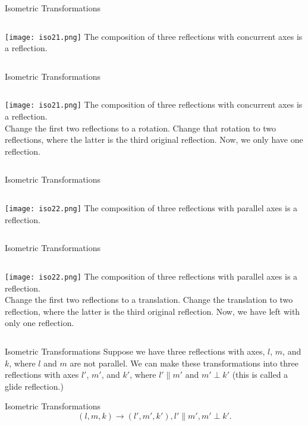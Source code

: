 \documentclass{beamer}
\begin{document}
\begin{frame}{Isometric Transformations}
	\begin{columns}
		\texttt{[image: iso21.png]}
		The composition of three reflections with concurrent
		axes is a reflection.
	\end{columns}
\end{frame}
\begin{frame}{Isometric Transformations}
	\begin{columns}
		\column{0.6\textwidth}
		\texttt{[image: iso21.png]}
		\column{0.4\textwidth}
		The composition of three reflections with concurrent
		axes is a reflection.\\
		\phantom{Spacing}
		Change the first two reflections to a rotation.
		Change that rotation to two reflections, where the
		latter is the third original reflection. Now, we 
		only have one reflection.
	\end{columns}
\end{frame}
\begin{frame}{Isometric Transformations}
	\begin{columns}
		\texttt{[image: iso22.png]}
		The composition of three reflections with parallel axes
		is a reflection.
	\end{columns}
\end{frame}
\begin{frame}{Isometric Transformations}
	\begin{columns}
		\column{0.6\textwidth}
		\texttt{[image: iso22.png]}
		\column{0.4\textwidth}
		The composition of three reflections with parallel axes
		is a reflection.\\
		\phantom{Spacing}
		Change the first two reflections to a translation.
		Change the translation to two reflection, where
		the latter is the third original reflection. Now,
		we have left with only one reflection.
	\end{columns}
\end{frame}
\begin{frame}{Isometric Transformations}
	Suppose we have three reflections with axes, $l$,
	$m$, and $k$, where $l$ and $m$ are not parallel.
	We can make these transformations into three reflections 
	with axes $l'$, $m'$, and $k'$, where  $l'\parallel m'$
	and $m'\perp k'$ (this is called a glide reflection.)
\end{frame}
\begin{frame}{Isometric Transformations}
	\[
		(l, m, k) \to (l', m', k'), l'\parallel m', m'\perp k'
	.\] 
\end{frame}
\end{document}
